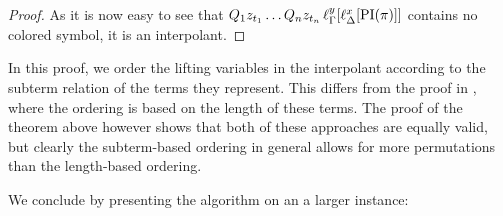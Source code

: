\begin{proof}
	As it is now easy to see that $Q_1 z_{t_1} \dots Q_n z_{t_n}\,\ell_{\Gamma}^{y}[\ell_{\Delta}^{x}[\operatorname{PI}(\pi)]]$ contains no colored symbol, it is an interpolant.
\end{proof}


\begin{remark}
	In this proof, we order the lifting variables in the interpolant according to the subterm relation of the terms they represent.
	This differs from the proof in \cite{Huang95}, where the ordering is based on the length of these terms.
	The proof of the theorem above however shows that both of these approaches are equally valid, but clearly the subterm-based ordering in general allows for more permutations than the length-based ordering. 
\end{remark}

We conclude by presenting the algorithm on an a larger instance: 

